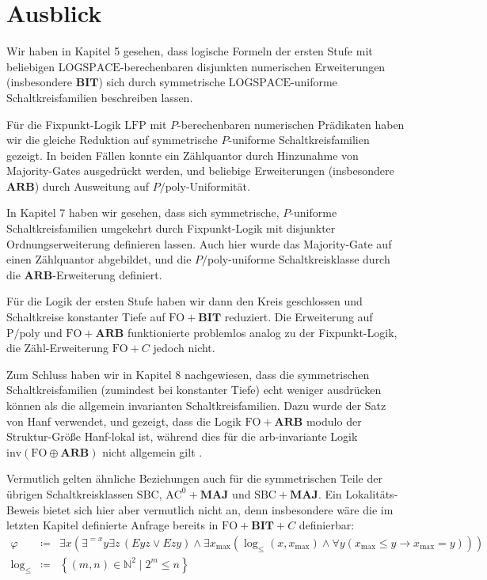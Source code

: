 
\chapter{Ausblick}

Wir haben in Kapitel 5 gesehen, dass logische Formeln der ersten Stufe
mit beliebigen $\mathrm{LOGSPACE}$-berechenbaren disjunkten numerischen
Erweiterungen (insbesondere $\mathbf{BIT}$) sich durch symmetrische
$\mathrm{LOGSPACE}$-uniforme Schaltkreisfamilien beschreiben lassen. 

Für die Fixpunkt-Logik $\mathrm{LFP}$ mit $P$-berechenbaren numerischen
Prädikaten haben wir die gleiche Reduktion auf symmetrische $P$-uniforme
Schaltkreisfamilien gezeigt. In beiden Fällen konnte ein Zählquantor
durch Hinzunahme von Majority-Gates ausgedrückt werden, und beliebige
Erweiterungen (insbesondere $\mathbf{ARB}$) durch Ausweitung auf
$P/\mathrm{poly}$-Uniformität.

In Kapitel 7 haben wir gesehen, dass sich symmetrische, $P$-uniforme
Schaltkreisfamilien umgekehrt durch Fixpunkt-Logik mit disjunkter
Ordnungserweiterung definieren lassen. Auch hier wurde das Majority-Gate
auf einen Zählquantor abgebildet, und die $P/\mathrm{poly}$-uniforme
Schaltkreisklasse durch die $\mathbf{ARB}$-Erweiterung definiert.

Für die Logik der ersten Stufe haben wir dann den Kreis geschlossen
und Schaltkreise konstanter Tiefe auf $\mathrm{FO}+\mathbf{BIT}$
reduziert. Die Erweiterung auf $\mathrm{P/\mathrm{poly}}$ und $\mathrm{FO}+\mathbf{ARB}$
funktionierte problemlos analog zu der Fixpunkt-Logik, die Zähl-Erweiterung
$\mathrm{FO}+C$ jedoch nicht.

Zum Schluss haben wir in Kapitel 8 nachgewiesen, dass die symmetrischen
Schaltkreisfamilien (zumindest bei konstanter Tiefe) echt weniger
ausdrücken können als die allgemein invarianten Schaltkreisfamilien.
Dazu wurde der Satz von Hanf verwendet, und gezeigt, dass die Logik
$\mathrm{FO}+\mathbf{ARB}$ modulo der Struktur-Größe Hanf-lokal ist,
während dies für die arb-invariante Logik $\mathrm{inv}\left(\mathrm{FO}\oplus\mathbf{ARB}\right)$
nicht allgemein gilt \cite{AnMeScSe11}.

Vermutlich gelten ähnliche Beziehungen auch für die symmetrischen
Teile der übrigen Schaltkreisklassen $\mathrm{SBC}$, $\mathrm{AC}^{0}+\mathbf{MAJ}$
und $\mathrm{SBC}+\mathbf{MAJ}$. Ein Lokalitäts-Beweis bietet sich
hier aber vermutlich nicht an, denn insbesondere wäre die im letzten
Kapitel definierte Anfrage bereits in $\mathrm{FO}+\mathbf{BIT}+C$
definierbar:
\begin{eqnarray*}
\varphi & \coloneqq & \exists x\left(\exists^{=x}y\exists z\,\left(Eyz\vee Ezy\right)\wedge\exists x_{\max}\left(\log_{\leqslant}\left(x,x_{\max}\right)\wedge\forall y\left(x_{\max}\leqslant y\rightarrow x_{\max}=y\right)\right)\right)\\
\log_{\leqslant} & \coloneqq & \left\{ \left(m,n\right)\in\mathbb{N}^{2}\mid2^{m}\leqslant n\right\} 
\end{eqnarray*}

